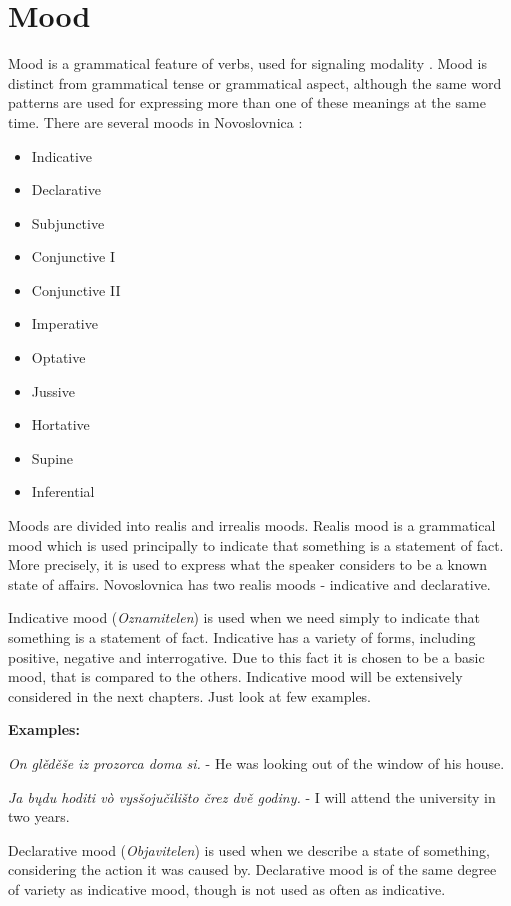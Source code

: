 \section{Mood}

Mood is a grammatical feature of verbs, used for signaling modality \cite{mood}. Mood is distinct from grammatical tense or grammatical aspect, although the same word patterns are used for expressing more than one of these meanings at the same time. There are several moods in Novoslovnica \cite{nsl-naklony}:

\begin{itemize}
	\item Indicative
	\item Declarative
	\item Subjunctive
	\item Conjunctive I
	\item Conjunctive II
	\item Imperative
	\item Optative
	\item Jussive
	\item Hortative
	\item Supine
	\item Inferential
\end{itemize}

Moods are divided into realis and irrealis moods. Realis mood is a grammatical mood which is used principally to indicate that something is a statement of fact. More precisely, it is used to express what the speaker considers to be a known state of affairs. Novoslovnica has two realis moods - indicative and declarative.

Indicative mood (\textit{Oznamitelen})  is used when we need simply to indicate that something is a statement of fact. Indicative has a variety of forms, including positive, negative and interrogative. Due to this fact it is chosen to be a basic mood, that is compared to the others. Indicative mood will be extensively considered in the next chapters. Just look at few examples.

\textbf{Examples:}

\textit{On glěděše iz prozorca doma si.} - He was looking out of the window of his house.

\textit{Ja bųdu hoditi vò vysšojučilišto črez dvě godiny.} - I will attend the university in two years.

Declarative mood (\textit{Objavitelen}) is used when we describe a state of something, considering the action it was caused by. Declarative mood is of the same degree of variety as indicative mood, though is not used as often as indicative.

